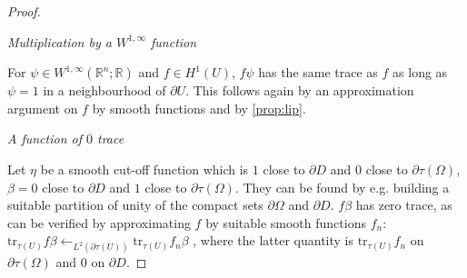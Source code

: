 \documentclass[english,a4paper,10pt,oneside]{scrbook}	%
\theoremstyle{break}
\newenvironment{mproof}[1][\proofname]{%
  \begin{proof}[#1]$ $\par\nobreak\ignorespaces
}{%
  \end{proof}
}
\renewcommand*{\proofname}{Proof}
\theoremstyle{remark}
\newcommand{\mR}{\mathbb{R}}
\newcommand{\ds}{\displaystyle}
\newcommand{\norm}[1]{\left\lVert#1\right\rVert}
\newcommand{\tr}{\text{tr}}
\begin{document}
\begin{appendices}
\begin{mproof}
%
%
%
%

\textit{Multiplication by a $W^{1,\infty}$ function}

For $\psi \in W^{1,\infty}(\mR^n;\mR)$ and $f \in H^1(U)$, $f\psi$ has the same trace as $f$ as long as $\psi = 1$ in a neighbourhood of $\partial U$. This follows again by an approximation argument on $f$ by smooth functions and by \cref{prop:lip}.

%

\textit{A function of $0$ trace}

Let $\eta$ be a smooth cut-off function which is $1$ close to $\partial D$ and $0$ close to $\partial \tau(\Omega)$, $\beta=0$ close to $\partial D$ and $1$ close to $\partial \tau(\Omega)$. They can be found by e.g. building a suitable partition of unity of the compact sets $\partial \Omega$ and $\partial D$.
$f\beta$ has zero trace, as can be verified by approximating $f$ by suitable smooth functions $f_n$: 
$\ds\tr_{\tau(U)} f\beta \leftarrow_{L^2(\partial \tau(U))} \tr_{\tau(U)} f_n \beta $
, where the latter quantity is $\tr_{\tau(U)} f_n $ on $\partial \tau(\Omega)$ and $0$ on $\partial D$.


\end{mproof}
\end{appendices}
\end{document}

